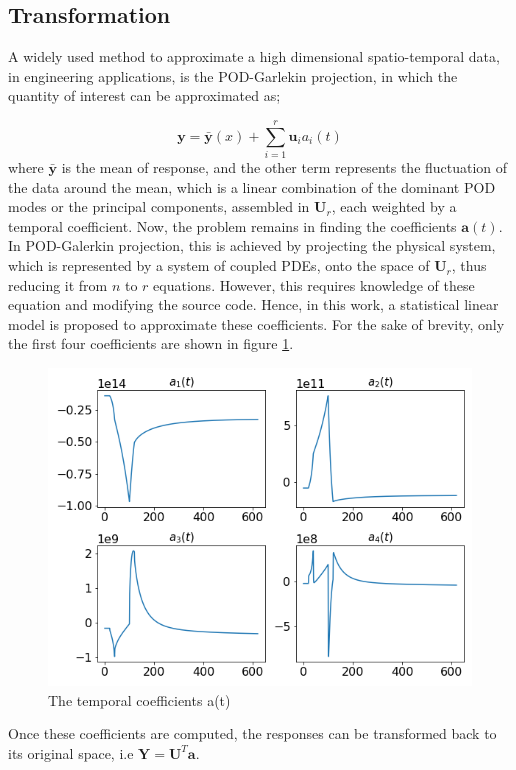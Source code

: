 \documentclass{anstrans}
\begin{document}
\subsection{Transformation}

A widely used method to approximate a high dimensional spatio-temporal data, in engineering applications, is the POD-Garlekin projection, in which the quantity of interest can be approximated as; 

\begin{equation}
\textbf{y} = \bar{\textbf{y}}(x) + \sum_{i=1}^r \textbf{u}_i a_i(t)
\label{pod-galerkin}
\end{equation}
where $\bar{\textbf{y}}$ is the mean of response, and the other term represents the fluctuation of the data around the mean, which is a linear combination of the dominant POD modes or the principal components, assembled in $\textbf{U}_r$, each weighted by a temporal coefficient.
Now, the problem remains in finding the coefficients $\textbf{a}(t)$.
In POD-Galerkin projection, this is achieved by projecting the physical system, which is represented by a system of coupled PDEs, onto the space of $\textbf{U}_r$, thus reducing it from $n$ to $r$ equations.
However, this requires knowledge of these equation and modifying the source code.
Hence, in this work, a statistical linear model is proposed to approximate these coefficients. For the sake of brevity, only the first four coefficients are shown in figure \ref{fig:coeffs}.\\
\begin{figure}[!h]
	\centering
	\includegraphics[scale=0.4]{./figs/temp_coeff.png}
	\caption{The temporal coefficients a(t)}
	\label{fig:coeffs}
\end{figure}
Once these coefficients are computed, the responses can be transformed back to its original space, i.e $\textbf{Y} = \textbf{U}^T \textbf{a}$.
\end{document}
